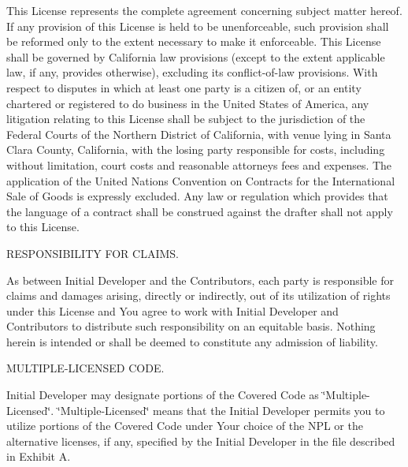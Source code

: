 \begin{DoxyEnumerate}
This License represents the complete agreement concerning subject matter hereof. If any provision of this License is held to be unenforceable, such provision shall be reformed only to the extent necessary to make it enforceable. This License shall be governed by California law provisions (except to the extent applicable law, if any, provides otherwise), excluding its conflict-\/of-\/law provisions. With respect to disputes in which at least one party is a citizen of, or an entity chartered or registered to do business in the United States of America, any litigation relating to this License shall be subject to the jurisdiction of the Federal Courts of the Northern District of California, with venue lying in Santa Clara County, California, with the losing party responsible for costs, including without limitation, court costs and reasonable attorneys\textquotesingle{} fees and expenses. The application of the United Nations Convention on Contracts for the International Sale of Goods is expressly excluded. Any law or regulation which provides that the language of a contract shall be construed against the drafter shall not apply to this License.
\item R\+E\+S\+P\+O\+N\+S\+I\+B\+I\+L\+I\+T\+Y F\+O\+R C\+L\+A\+I\+M\+S.

As between Initial Developer and the Contributors, each party is responsible for claims and damages arising, directly or indirectly, out of its utilization of rights under this License and You agree to work with Initial Developer and Contributors to distribute such responsibility on an equitable basis. Nothing herein is intended or shall be deemed to constitute any admission of liability.
\item M\+U\+L\+T\+I\+P\+L\+E-\/\+L\+I\+C\+E\+N\+S\+E\+D C\+O\+D\+E.

Initial Developer may designate portions of the Covered Code as \char`\"{}\+Multiple-\/\+Licensed\char`\"{}. \char`\"{}\+Multiple-\/\+Licensed\char`\"{} means that the Initial Developer permits you to utilize portions of the Covered Code under Your choice of the N\+P\+L or the alternative licenses, if any, specified by the Initial Developer in the file described in Exhibit A.
\end{DoxyEnumerate}

